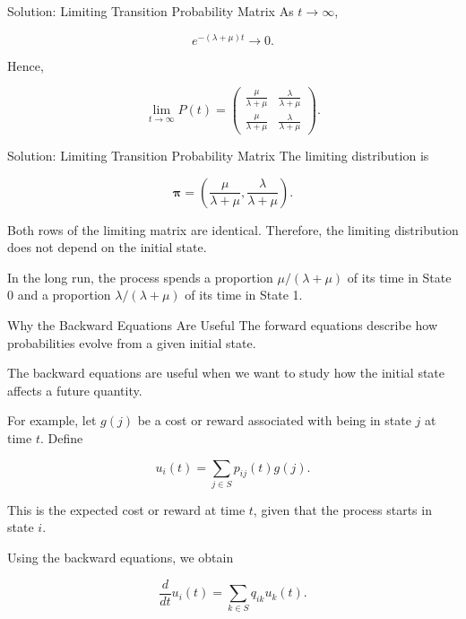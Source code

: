 \documentclass[
  ignorenonframetext,
  aspectratio=169,
]{beamer}
\begin{document}
\begin{frame}{Solution: Limiting Transition Probability Matrix}
\protect{}\label{solution-limiting-transition-probability-matrix}
As \(t\to\infty\),

\[
e^{-(\lambda+\mu)t}\longrightarrow 0.
\]

Hence,

\[
\boxed{
\lim_{t\to\infty}P(t)
=
\begin{pmatrix}
\displaystyle\frac{\mu}{\lambda+\mu}
&
\displaystyle\frac{\lambda}{\lambda+\mu}
\\[8pt]
\displaystyle\frac{\mu}{\lambda+\mu}
&
\displaystyle\frac{\lambda}{\lambda+\mu}
\end{pmatrix}.
}
\]
\end{frame}

\begin{frame}{Solution: Limiting Transition Probability Matrix}
\protect{}\label{solution-limiting-transition-probability-matrix-1}
The limiting distribution is

\[
\boldsymbol{\pi}
=
\left(
\frac{\mu}{\lambda+\mu},
\frac{\lambda}{\lambda+\mu}
\right).
\]

Both rows of the limiting matrix are identical. Therefore, the limiting
distribution does not depend on the initial state.

In the long run, the process spends a proportion \(\mu/(\lambda+\mu)\)
of its time in State 0 and a proportion \(\lambda/(\lambda+\mu)\) of its
time in State 1.
\end{frame}

\begin{frame}{Why the Backward Equations Are Useful}
\protect{}\label{why-the-backward-equations-are-useful}
The forward equations describe how probabilities evolve from a given
initial state.

The backward equations are useful when we want to study how the initial
state affects a future quantity.

For example, let \(g(j)\) be a cost or reward associated with being in
state \(j\) at time \(t\). Define

\[
u_i(t)
=
\sum_{j\in S}p_{ij}(t)g(j).
\]

This is the expected cost or reward at time \(t\), given that the
process starts in state \(i\).

Using the backward equations, we obtain

\[
\boxed{
\frac{d}{dt}u_i(t)
=
\sum_{k\in S}q_{ik}u_k(t).
}
\]
\end{frame}
\end{document}
